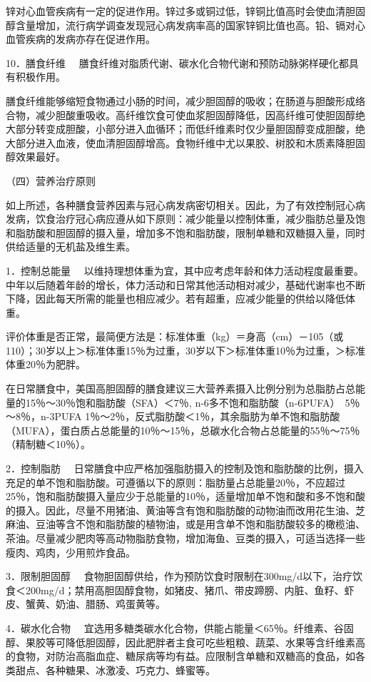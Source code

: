 锌对心血管疾病有一定的促进作用。锌过多或铜过低，锌铜比值高时会使血清胆固醇含量增加，流行病学调查发现冠心病发病率高的国家锌铜比值也高。铅、镉对心血管疾病的发病亦存在促进作用。

{10．膳食纤维}
　膳食纤维对脂质代谢、碳水化合物代谢和预防动脉粥样硬化都具有积极作用。

膳食纤维能够缩短食物通过小肠的时间，减少胆固醇的吸收；在肠道与胆酸形成络合物，减少胆酸重吸收。高纤维饮食可使血浆胆固醇降低，因高纤维可使胆固醇绝大部分转变成胆酸，小部分进入血循环；而低纤维素时仅少量胆固醇变成胆酸，绝大部分进入血液，使血清胆固醇增高。食物纤维中尤以果胶、树胶和木质素降胆固醇效果最好。

（四）营养治疗原则

如上所述，各种膳食营养因素与冠心病发病密切相关。因此，为了有效控制冠心病发病，饮食治疗冠心病应遵从如下原则：减少能量以控制体重，减少脂肪总量及饱和脂肪酸和胆固醇的摄入量，增加多不饱和脂肪酸，限制单糖和双糖摄入量，同时供给适量的无机盐及维生素。

{1．控制总能量}
　以维持理想体重为宜，其中应考虑年龄和体力活动程度最重要。中年以后随着年龄的增长，体力活动和日常其他活动相对减少，基础代谢率也不断下降，因此每天所需的能量也相应减少。若有超重，应减少能量的供给以降低体重。

评价体重是否正常，最简便方法是：标准体重（kg）＝身高（cm）－105（或110）；30岁以上＞标准体重15％为过重，30岁以下＞标准体重10％为过重，＞标准体重20％为肥胖。

在日常膳食中，美国高胆固醇的膳食建议三大营养素摄入比例分别为总脂肪占总能量的15％～30％饱和脂肪酸（SFA）＜7％,
n-6多不饱和脂肪酸（n-6PUFA）　5％～8％，n-3PUFA
1％～2％，反式脂肪酸＜1％，其余脂肪为单不饱和脂肪酸（MUFA），蛋白质占总能量的10％～15％，总碳水化合物占总能量的55％～75％（精制糖＜10％）。

{2．控制脂肪}
　日常膳食中应严格加强脂肪摄入的控制及饱和脂肪酸的比例，摄入充足的单不饱和脂肪酸。可遵循以下的原则：脂肪量占总能量20％，不应超过25％，饱和脂肪酸摄入量应少于总能量的10％，适量增加单不饱和酸和多不饱和酸的摄入。因此，尽量不用猪油、黄油等含有饱和脂肪酸的动物油而改用花生油、芝麻油、豆油等含不饱和脂肪酸的植物油，或是用含单不饱和脂肪酸较多的橄榄油、茶油。尽量减少肥肉等高动物脂肪食物，增加海鱼、豆类的摄入，可适当选择一些瘦肉、鸡肉，少用煎炸食品。

{3．限制胆固醇}
　食物胆固醇供给，作为预防饮食时限制在300mg/d以下，治疗饮食＜200mg/d；禁用高胆固醇食物，如猪皮、猪爪、带皮蹄膀、内脏、鱼籽、虾皮、蟹黄、奶油、腊肠、鸡蛋黄等。

{4．碳水化合物}
　宜选用多糖类碳水化合物，供能占能量＜65％。纤维素、谷固醇、果胶等可降低胆固醇，因此肥胖者主食可吃些粗粮、蔬菜、水果等含纤维素高的食物，对防治高脂血症、糖尿病等均有益。应限制含单糖和双糖高的食品，如各类甜点、各种糖果、冰激凌、巧克力、蜂蜜等。

